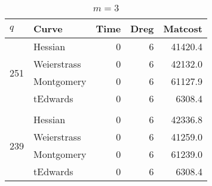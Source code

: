 
\begin{table}[!h]
\centering
\caption{$m=3$}
\label{tb:m=3}
\begin{tabular}{llrrr}
\hline
\multicolumn{1}{|l|}{$q$}                  & \multicolumn{1}{l|}{Curve}       & \multicolumn{1}{l|}{Time} & \multicolumn{1}{l|}{Dreg} & \multicolumn{1}{l|}{Matcost} \\ \hline
\multicolumn{1}{|l|}{\multirow{4}{*}{251}} & \multicolumn{1}{l|}{Hessian}     & \multicolumn{1}{r|}{0}    & \multicolumn{1}{r|}{6}    & \multicolumn{1}{r|}{41420.4} \\ \cline{2-5} 
\multicolumn{1}{|l|}{}                     & \multicolumn{1}{l|}{Weierstrass} & \multicolumn{1}{r|}{0}    & \multicolumn{1}{r|}{6}    & \multicolumn{1}{r|}{42132.0} \\ \cline{2-5} 
\multicolumn{1}{|l|}{}                     & \multicolumn{1}{l|}{Montgomery}  & \multicolumn{1}{r|}{0}    & \multicolumn{1}{r|}{6}    & \multicolumn{1}{r|}{61127.9} \\ \cline{2-5} 
\multicolumn{1}{|l|}{}                     & \multicolumn{1}{l|}{tEdwards}    & \multicolumn{1}{r|}{0}    & \multicolumn{1}{r|}{6}    & \multicolumn{1}{r|}{6308.4}  \\ \hline \vspace{-3mm}
                                           &                                  &                           &                           &                              \\ \hline
\multicolumn{1}{|l|}{\multirow{4}{*}{239}} & \multicolumn{1}{l|}{Hessian}     & \multicolumn{1}{r|}{0}    & \multicolumn{1}{r|}{6}    & \multicolumn{1}{r|}{42336.8} \\ \cline{2-5} 
\multicolumn{1}{|l|}{}                     & \multicolumn{1}{l|}{Weierstrass} & \multicolumn{1}{r|}{0}    & \multicolumn{1}{r|}{6}    & \multicolumn{1}{r|}{41259.0} \\ \cline{2-5} 
\multicolumn{1}{|l|}{}                     & \multicolumn{1}{l|}{Montgomery}  & \multicolumn{1}{r|}{0}    & \multicolumn{1}{r|}{6}    & \multicolumn{1}{r|}{61239.0} \\ \cline{2-5} 
\multicolumn{1}{|l|}{}                     & \multicolumn{1}{l|}{tEdwards}    & \multicolumn{1}{r|}{0}    & \multicolumn{1}{r|}{6}    & \multicolumn{1}{r|}{6308.4}  \\ \hline
\end{tabular}
\end{table}


